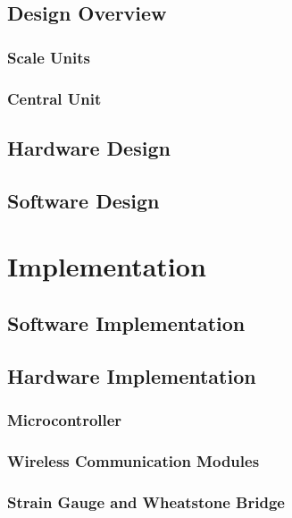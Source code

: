 \documentclass{l3proj}
\begin{document}
\section{Design Overview}

\subsection{Scale Units}
\label{scale}

\subsection{Central Unit}
\label{central}


\label{Block Diagram}
\section{Hardware Design}


\section{Software Design}

\chapter{Implementation}
\label{impl}
\section{Software Implementation}

\section{Hardware Implementation}

\subsection{Microcontroller}

\subsection{Wireless Communication Modules}

\subsection{Strain Gauge and Wheatstone Bridge}

\end{document}
